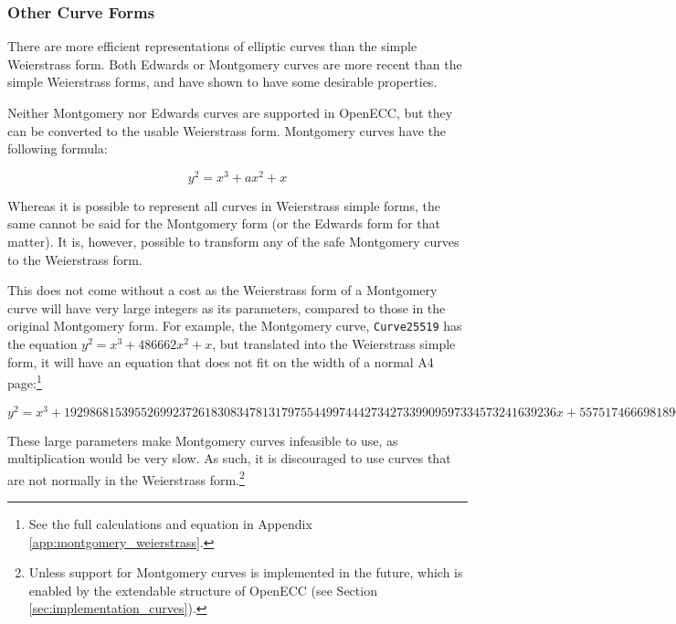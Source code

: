 \subsubsection{Other Curve Forms}

There are more efficient representations of elliptic curves than the simple
Weierstrass form. Both Edwards or Montgomery curves are more recent than the simple Weierstrass forms,
and have shown to have some desirable properties.\cite{safecurves}

Neither Montgomery nor Edwards curves are supported in OpenECC, but they can be converted to the
usable Weierstrass form. Montgomery curves have the following formula:

\begin{equation}
	y^2 = x^3 + ax^2 + x
\end{equation}

Whereas it is possible to represent all curves in Weierstrass simple forms, the same cannot be said for
the Montgomery form (or the Edwards form for that matter). It is, however, possible to
transform any of the safe Montgomery curves to the Weierstrass form.\cite{safecurves}

This does not come without a cost as the Weierstrass form of a Montgomery curve will have
very large integers as its parameters, compared to those in the original Montgomery form. For example,
the Montgomery curve, \verb|Curve25519| has the equation \(y^2 = x^3+486662x^2+x\), but
translated into the Weierstrass simple form, it will have an equation that does not fit on the width of
a normal A4 page:\footnote{See the full calculations and equation in Appendix \ref{app:montgomery_weierstrass}.}

\begin{equation}
	y^2 =
	x^3 +
	19298681539552699237261830834781317975544997444273427339909597334573241639236x +
	55751746669818908907645289078257140818241103727901012315294400837956729358436
\end{equation}

These large parameters make Montgomery curves infeasible to use, as multiplication would be very slow. As such,
it is discouraged to use curves that are not normally in the Weierstrass form.\footnote{Unless support for Montgomery
curves is implemented in the future, which is enabled by the extendable structure of OpenECC (see Section
\ref{sec:implementation_curves}).}